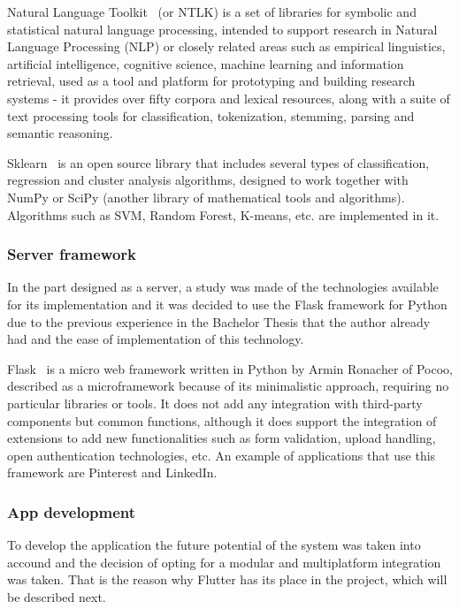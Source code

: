 Natural Language Toolkit~\cite{NLTKNatu6:online} (or NTLK) is a set of libraries for symbolic and statistical natural language processing, intended to support research in Natural Language Processing (NLP) or closely related areas such as empirical linguistics, artificial intelligence, cognitive science, machine learning and information retrieval, used as a tool and platform for prototyping and building research systems - it provides over fifty corpora and lexical resources, along with a suite of text processing tools for classification, tokenization, stemming, parsing and semantic reasoning.

Sklearn~\cite{scikitle66:online} is an open source library that includes several types of classification, regression and cluster analysis algorithms, designed to work together with NumPy or SciPy (another library of mathematical tools and algorithms). Algorithms such as SVM, Random Forest, K-means, etc. are implemented in it.


\subsubsection{Server framework}
In the part designed as a server, a study was made of the technologies available for its implementation and it was decided to use the Flask framework for Python due to the previous experience in the Bachelor Thesis that the author already had and the ease of implementation of this technology.

Flask~\cite{Welcomet8:online} is a micro web framework written in Python by Armin Ronacher of Pocoo, described as a microframework because of its minimalistic approach, requiring no particular libraries or tools. It does not add any integration with third-party components but common functions, although it does support the integration of extensions to add new functionalities such as form validation, upload handling, open authentication technologies, etc. An example of applications that use this framework are Pinterest and LinkedIn.


\subsubsection{App development}
To develop the application the future potential of the system was taken into accound and the decision of opting for a modular and multiplatform integration was taken. That is the reason why Flutter has its place in the project, which will be described next.

